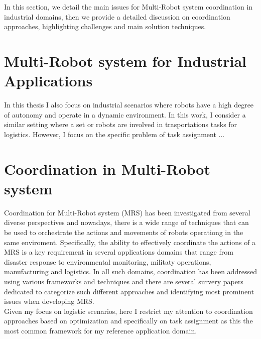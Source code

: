 In this section, we detail the main issues for Multi-Robot system coordination 
in industrial domains, then we provide a detailed discussion on coordination
approaches, highlighting challenges and main solution techniques.

\section{Multi-Robot system for Industrial Applications}
In this thesis I also focus on industrial scenarios where robots have a high
degree of autonomy and operate in a dynamic environment. 
% 
% 
% 
% 
In this work, I consider a similar setting where a set or robots are involved
in trasportations tasks for logistics. However, I focus on the specific problem
of task assignment ...


\section{Coordination in Multi-Robot system}
Coordination for Multi-Robot system (MRS) has been investigated from several diverse
perspectives and nowadays, there is a wide range of techniques that can be used to 
orchestrate the actions and movements of robots operationg in the same enviroment.
Specifically, the ability to effectively coordinate the actions of a MRS is a key 
requirement in several applications domains that range from disaster response to 
environmental monitoring, militaty operations, manufacturing and logistics. 
In all such domains, coordination has been addressed using various frameworks and 
techniques and there are several survery papers dedicated to categorize such different
approaches and identifying most prominent issues when developing MRS.
% 
% 
% 
% 
\\
Given my focus on logistic scenarios, here I restrict my attention to coordination
approaches based on optimization and specifically on task assignment as this the most 
common framework for my reference application domain.


